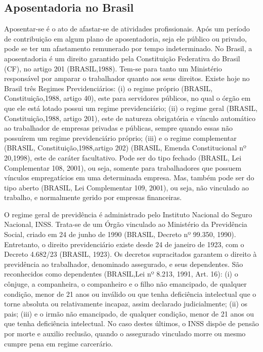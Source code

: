 
\begin{apendicesenv}

\partapendices

\chapter{Aposentadoria no Brasil}

Aposentar-se é o ato de afastar-se de atividades profissionais. Após um período de contribuição em algum plano de aposentadoria, seja ele público ou privado, pode se ter um afastamento remunerado por tempo indeterminado. No Brasil, a aposentadoria é um direito garantido pela Constituição Federativa do Brasil (CF), no artigo 201 (BRASIL,1988). Tem-se para tanto um Ministério responsável por amparar o trabalhador quanto aos seus direitos. Existe hoje no Brasil três Regimes Previdenciários: (i) o regime próprio (BRASIL, Constituição,1988, artigo 40), este para servidores públicos, no qual o órgão em que ele está lotado possui um regime previdenciário; (ii) o regime geral (BRASIL, Constituição,1988, artigo 201), este de natureza obrigatória e vínculo automático ao trabalhador de empresas privadas e públicas, sempre quando essas não possuírem um regime previdenciário próprio; (iii) e o regime complementar (BRASIL, Constituição,1988,artigo 202) (BRASIL, Emenda Constitucional nº 20,1998), este de caráter facultativo. Pode ser do tipo fechado (BRASIL, Lei Complementar 108, 2001), ou seja, somente para trabalhadores que possuem vínculos empregatícios em uma determinada empresa. Mas, também pode ser do tipo aberto (BRASIL, Lei Complementar 109, 2001), ou seja, não vinculado ao trabalho, e normalmente gerido por empresas financeiras.

O regime geral de previdência é administrado pelo Instituto Nacional do Seguro Nacional, INSS. Trata-se de um Órgão vinculado ao Ministério da Previdência Social, criado em 24 de junho de 1990 (BRASIL, Decreto nº 99.350, 1990). Entretanto, o direito previdenciário existe desde 24 de janeiro de 1923, com o Decreto 4.682/23 (BRASIL, 1923). Os decretos supracitados garantem o direito à previdência ao trabalhador, denominado assegurado, e seus dependentes. São reconhecidos como dependentes (BRASIL,Lei nº 8.213, 1991, Art. 16): (i) o cônjuge, a companheira, o companheiro e o filho não emancipado, de qualquer condição, menor de 21 anos ou inválido ou que tenha deficiência intelectual que o torne absoluta ou relativamente incapaz, assim declarado judicialmente; (ii) os pais; (iii) e o irmão não emancipado, de qualquer condição, menor de 21 anos ou que tenha deficiência intelectual. No caso destes últimos, o INSS dispõe de pensão por morte e auxilio reclusão, quando o assegurado vinculado morre ou mesmo cumpre pena em regime carcerário.


\end{apendicesenv}

